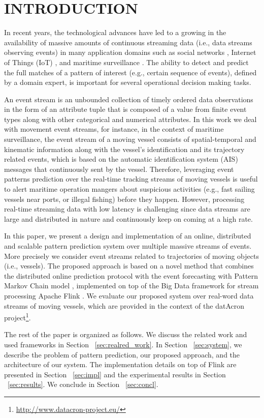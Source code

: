 \section{INTRODUCTION}


\par In recent years, the technological advances have led to a growing in the availability of massive amounts of continuous streaming data (i.e., data streams observing events) in many application domains such as social networks \cite{mathioudakis2010twittermonitor}, Internet of Things (IoT) \cite{miorandi2012internet}, and maritime surveillance \cite{patroumpas2015event}.  The ability to detect and predict the full matches of a pattern of interest (e.g., certain sequence of events), defined by a domain expert, is important for several operational decision making tasks.
\par An event stream is an unbounded collection of timely ordered data observations in the form of an attribute tuple that is composed of a value from finite event types along with other categorical and numerical attributes. In this work we deal with movement event streams, for instance, in the context of maritime surveillance, the event stream of a moving vessel consists of spatial-temporal and kinematic information along with the vessel's identification and its trajectory related events, which is based on the automatic identification system (AIS) \cite{ais} messages that continuously sent by the vessel. Therefore, leveraging event patterns prediction over the real-time tracking streams of moving vessels is useful to alert maritime operation mangers about suspicious activities (e.g., fast sailing vessels near ports, or illegal fishing) before they happen. However, processing real-time streaming data with low latency is challenging since data streams are large and distributed in nature and continuously keep on coming at a high rate. 
\par In this paper, we present a design and implementation of an online, distributed and scalable pattern prediction system over multiple massive streams of events. More precisely we consider event streams related to trajectories of moving objects (i.e., vessels). The proposed approach is based on a novel method that combines the distributed online prediction protocol \cite{dekel2012optimal,kamp2014communication} with the event forecasting with Pattern Markov Chain model \cite{alevizos2017event}, implemented on top of the Big Data framework for stream processing Apache Flink \cite{Flink}. We evaluate our proposed system over real-word data streams of moving vessels, which are provided in the context of the datAcron project\footnote{\url{http://www.datacron-project.eu/}}.

\par The rest of the paper is organized as follows. We discuss the related work and used frameworks in Section ~\ref{sec:realred_work}. In Section ~\ref{sec:system}, we describe the problem of pattern prediction, our proposed approach, and the architecture of our system. The implementation details on top of Flink are presented in Section ~\ref{sec:impl} and the experimental results in Section ~\ref{sec:results}. We conclude in Section ~\ref{sec:concl}.

